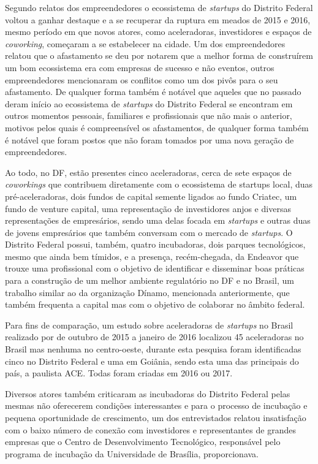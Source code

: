Segundo relatos dos empreendedores o ecossistema de \textit{startups} do Distrito Federal voltou a ganhar destaque e a se recuperar da ruptura em meados de 2015 e 2016, mesmo período em que novos atores, como aceleradoras, investidores e espaços de \textit{coworking}, começaram a se estabelecer na cidade. Um dos empreendedores relatou que o afastamento se deu por notarem que a melhor forma de construírem um bom ecossistema era com empresas de sucesso e não eventos, outros empreendedores mencionaram os conflitos como um dos pivôs para o seu afastamento. De qualquer forma também é notável que aqueles que no passado deram início ao ecossistema de \textit{startups} do Distrito Federal se encontram em outros momentos pessoais, familiares e profissionais que não mais o anterior, motivos pelos quais é compreensível os afastamentos, de qualquer forma também é notável que foram postos que não foram tomados por uma nova geração de empreendedores.

Ao todo, no DF, estão presentes cinco aceleradoras, cerca de sete espaços de \textit{coworkings} que contribuem diretamente com o ecossistema de startups local, duas pré-aceleradoras, dois fundos de capital semente ligados ao fundo Criatec, um fundo de venture capital, uma representação de investidores anjos e diversas representações de empresários, sendo uma delas focada em \textit{startups} e outras duas de jovens empresários que também conversam com o mercado de \textit{startups}. O Distrito Federal possui, também, quatro incubadoras, dois parques tecnológicos, mesmo que ainda bem tímidos, e a presença, recém-chegada, da Endeavor que trouxe uma profissional com o objetivo de identificar e disseminar boas práticas para a construção de um melhor ambiente regulatório no DF e no Brasil, um trabalho similar ao da organização Dínamo, mencionada anteriormente, que também frequenta a capital mas com o objetivo de colaborar no âmbito federal.

Para fins de comparação, um estudo sobre aceleradoras de \textit{startups} no Brasil realizado por  de outubro de 2015 a janeiro de 2016 localizou 45 aceleradoras no Brasil mas nenhuma no centro-oeste, durante esta pesquisa foram identificadas cinco no Distrito Federal e uma em Goiânia, sendo esta uma das principais do país, a paulista ACE. Todas foram criadas em 2016 ou 2017.

Diversos atores também criticaram as incubadoras do Distrito Federal pelas mesmas não oferecerem condições interessantes e para o processo de incubação e pequena oportunidade de crescimento, um dos entrevistados relatou insatisfação com o baixo número de conexão com investidores e representantes de grandes empresas que o Centro de Desenvolvimento Tecnológico, responsável pelo programa de incubação da Universidade de Brasília, proporcionava.

